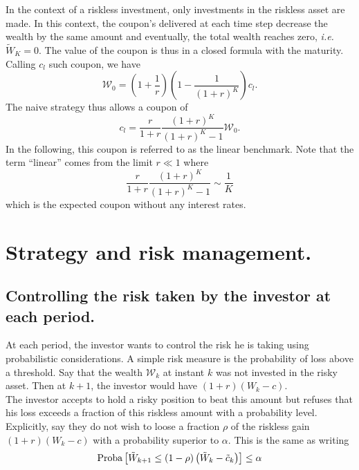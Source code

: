 \documentclass{article}
\newcommand{\W}{\mathcal{W}}
\newcommand{\Proba}{\textnormal{Proba}}
\begin{document}
In the context of a riskless investment, only investments in the riskless asset are made. In this context, the coupon's delivered at each time step decrease the wealth by the same amount and eventually, the total wealth reaches zero, \textit{i.e.} $\tilde W_K = 0$. The value of the coupon is thus in a closed formula with the maturity. Calling $c_l$ such coupon, we have
$$
 \W_0 = \left( 1 + \frac{1}{r} \right)\left( 1 - \frac{1}{\left( 1 + r \right)^K} \right)c_l.
$$
The naive strategy thus allows a coupon of
\begin{equation}
c_l = \frac{r}{1 + r} \frac{\left( 1 + r \right)^K}{\left( 1 + r \right)^K - 1}  \W_0.
\end{equation}
In the following, this coupon is referred to as the linear benchmark. Note that the term  ``linear'' comes from the limit  $r\ll 1$ where 
$$
\frac{r}{1 + r} \frac{\left( 1 + r \right)^K}{\left( 1 + r \right)^K - 1} \sim \frac{1}{K}
$$
which is the expected coupon without any interest rates.

\section{Strategy and risk management.}

\subsection{Controlling the risk taken by the investor at each period.}

At each period, the investor wants to control the risk he is taking using probabilistic considerations. A simple risk measure is the probability of loss above a threshold. Say that the wealth $\W_k$ at instant $k$ was not invested in the risky asset. Then at $k + 1$, the investor would have $(1+ r)(W_k - c)$.\\

The investor accepts to hold a risky position to beat this amount but refuses that his loss exceeds a fraction of this riskless amount with a probability level. Explicitly, say they do not wish to loose a fraction $\rho$ of the riskless gain $(1+ r)(W_k - c)$ with a probability superior to $\alpha$. This is the same as writing
\begin{equation}
\Proba\left[ \tilde W_{k+1}  \leq \left( 1 - \rho \right) \left( \tilde W_k - \tilde c_k\right) \right] \leq \alpha
\end{equation}
\end{document}

